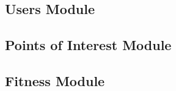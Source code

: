 \documentclass[11pt]{article}
\begin{document}
  \subsection{Users Module}
  
  \subsection{Points of Interest Module}
  
  \subsection{Fitness Module}

  
 
\end{document}
